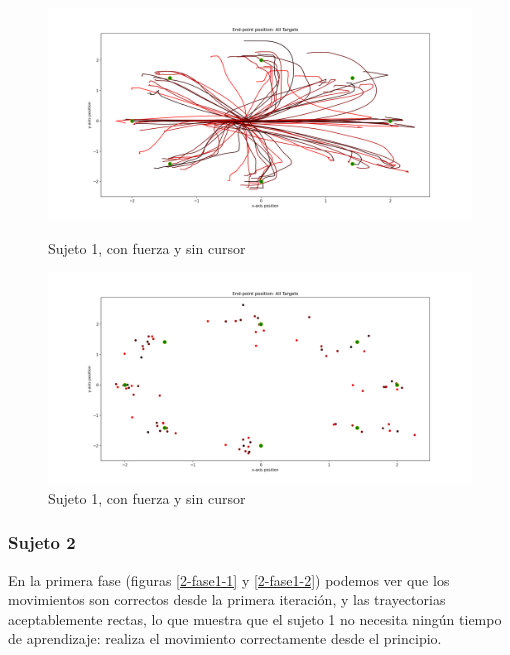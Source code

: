 \documentclass[a4paper,11pt, oneside]{book}
\begin{document}
\begin{figure}[H]
	\begin{minipage}[b]{0.5\linewidth}
		\centering
		\includegraphics[width=\linewidth]{sujeto1/force_no_cursor/trayectorias}
		\caption{Sujeto 1, con fuerza y sin cursor}
		\label{1-fase4-1}
	\end{minipage}
	\hspace{0.5cm}
	\begin{minipage}[b]{0.5\linewidth}
		\centering
		\includegraphics[width=\linewidth]{sujeto1/force_no_cursor/trayectorias_puntos}
		\caption{Sujeto 1, con fuerza y sin cursor}
		\label{1-fase4-2}
	\end{minipage}
\end{figure}


\subsubsection{Sujeto 2}

En la primera fase (figuras \ref{2-fase1-1} y \ref{2-fase1-2}) podemos ver que los movimientos son correctos desde la primera iteración, y las trayectorias aceptablemente rectas, lo que muestra que el sujeto 1 no necesita ningún tiempo de aprendizaje: realiza el movimiento correctamente desde el principio.
\end{document}
